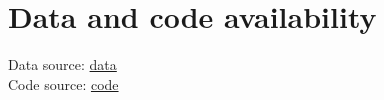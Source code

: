 \section{Data and code availability}
Data source: \href{https://www.kaggle.com/datasets/iliassekkaf/computerparts?resource=downlo}{data}
\\
Code source: \href{https://drive.google.com/drive/folders/1GeL4okZ9_bs0lAlA93FajCUkQ8V4jnou?usp=sharing&fbclid=IwZXh0bgNhZW0CMTAAAR1_dfD-snUrBtV4fBlCqpO4f8hrxA5yU9OEiGS65ExcUMwF-cCHH7x44LA_aem_AYiTgyF-0HZhQORg9QjnFRM_0oxRBC550F65yY2B051JL7YhjDny8tBIxWKQTLkGY-1PdA3sBjZBwp7lYSFvMsOH}{code}